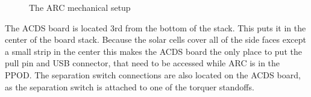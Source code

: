 \begin{figure}[!ht]
    \caption{The \acs{ARC} mechanical setup}
    \label{fig:arcMech}
\end{figure}

The \ac{ACDS} board is located 3rd from the bottom of the stack. This puts it in the center of the board stack. Because the solar cells cover all of the side faces except a small strip in the center this makes the \ac{ACDS} board the only place to put the pull pin and \ac{USB} connector, that need to be accessed while \ac{ARC} is in the \ac{PPOD}. The separation switch connections are also located on the \ac{ACDS} board, as the separation switch is attached to one of the torquer standoffs.

